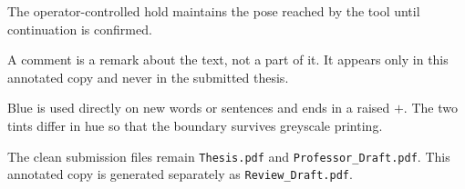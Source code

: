 \medskip
The operator-controlled hold maintains the pose reached by the tool until
continuation is confirmed.
\medskip

\noindent A comment is a remark about the text, not a part of it. It appears
only in this annotated copy and never in the submitted thesis.

Blue is used directly on new words or sentences and ends in a raised
\textcolor{reviewbluemark}{$+$}. The two tints differ in
hue so that the boundary survives greyscale printing.

The clean submission files remain \texttt{Thesis.pdf} and
\texttt{Professor\_Draft.pdf}. This annotated copy is generated separately as
\texttt{Review\_Draft.pdf}.
